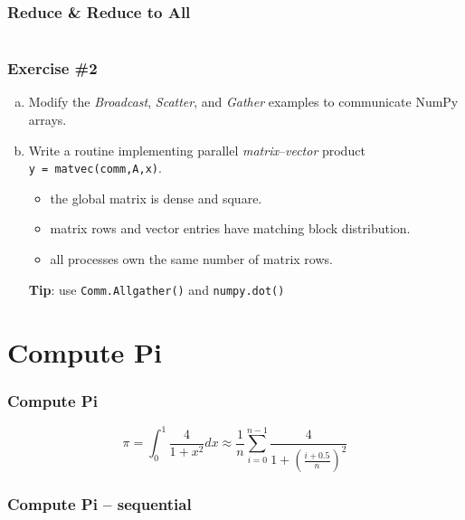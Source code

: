 \documentclass{beamer}
\begin{document}
\begin{frame}
  \frametitle{Reduce \& Reduce to All}
  \inputminted[linenos]{python}{coll_reduce.py}
\end{frame}

\begin{frame}
  \frametitle{Exercise \#2}
  \begin{enumerate}[a)]
  \item Modify the \emph{Broadcast}, \emph{Scatter}, and \emph{Gather}
    examples to communicate NumPy arrays.
  \item Write a routine implementing parallel
    \emph{matrix}--\emph{vector} product
    \texttt{y~=~matvec(comm,A,x)}.
    \begin{itemize}
    \item the global matrix is dense and square.
    \item matrix rows and vector entries have matching block
      distribution.
    \item all processes own the same number of matrix rows.
    \end{itemize}
    \textbf{Tip}: use \texttt{Comm.Allgather()} and \texttt{numpy.dot()}
  \end{enumerate}
\end{frame}


\section{Compute Pi}

\begin{frame}
  \frametitle{Compute Pi}
  \Large
  \begin{equation*}
    \pi =
    \int_0^1 \frac{4}{1+x^2} dx \approx
    \frac{1}{n}\sum_{i=0}^{n-1}\frac{4}{1+(\frac{i+0.5}{n})^2}
  \end{equation*}
\end{frame}

\begin{frame}[t]
  \frametitle{Compute Pi -- sequential}
  \inputminted[linenos]{python}{compute_pi-seq.py}
\end{frame}


\end{document}
